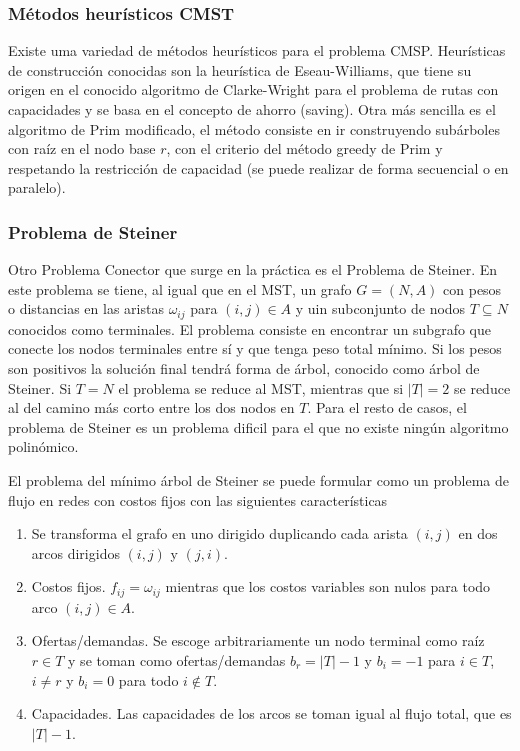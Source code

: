 \newpage

\subsubsection{Métodos heurísticos CMST}

Existe uma variedad de métodos heurísticos para el problema CMSP. Heurísticas de construcción conocidas son la heurística de
Eseau-Williams, que tiene su origen en el conocido algoritmo de Clarke-Wright para el problema de rutas con capacidades y se
basa en el concepto de ahorro (saving). Otra más sencilla es el algoritmo de Prim modificado, el método consiste en ir
construyendo subárboles con raíz en el nodo base $r$, con el criterio del método greedy de Prim y respetando la restricción
de capacidad (se puede realizar de forma secuencial o en paralelo).

\subsubsection{Problema de Steiner}

Otro Problema Conector que surge en la práctica es el Problema de Steiner. En este problema se tiene, al igual que en el MST,
un grafo $G=(N,A)$ con pesos o distancias en las aristas $\omega_{ij}$ para $(i,j)\in A$ y uin subconjunto de nodos
$T\subseteq N$ conocidos como terminales. El problema consiste en encontrar un subgrafo que conecte los nodos terminales entre
sí y que tenga peso total mínimo. Si los pesos son positivos la solución final tendrá forma de árbol, conocido como árbol de
Steiner. Si $T=N$ el problema se reduce al MST, mientras que si $|T|=2$ se reduce al del camino más corto entre los dos nodos
en $T$. Para el resto de casos, el problema de Steiner es un problema dificil para el que no existe ningún algoritmo
polinómico.

El problema del mínimo árbol de Steiner se puede formular como un problema de flujo en redes con costos fijos con las siguientes
características

\begin{enumerate}
    \item Se transforma el grafo en uno dirigido duplicando cada arista $(i,j)$ en dos arcos dirigidos $(i,j)$ y $(j,i)$.
    \item Costos fijos. $f_{ij}=\omega_{ij}$ mientras que los costos variables son nulos para todo arco $(i,j)\in A$.
    \item Ofertas/demandas. Se escoge arbitrariamente un nodo terminal como raíz $r\in T$ y se toman como ofertas/demandas
    $b_r=|T|-1$ y $b_i=-1$ para $i\in T$, $i\neq r$ y $b_i=0$ para todo $i\notin T$.
    \item Capacidades. Las capacidades de los arcos se toman igual al flujo total, que es $|T|-1$.
\end{enumerate}

